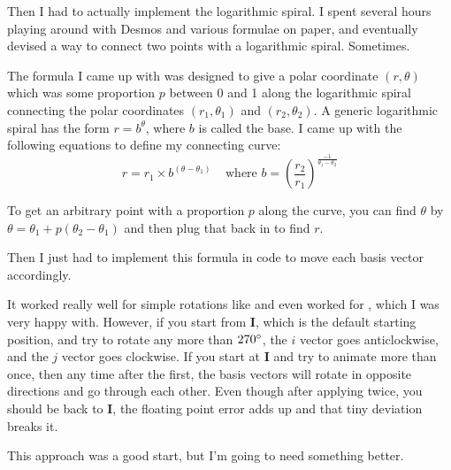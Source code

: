 \documentclass[../development.tex]{subfiles}
\begin{document}
Then I had to actually implement the logarithmic spiral. I spent several hours playing around with Desmos and various formulae on paper, and eventually devised a way to connect two points with a logarithmic spiral. Sometimes.

The formula I came up with was designed to give a polar coordinate $(r, \theta)$ which was some proportion $p$ between 0 and 1 along the logarithmic spiral connecting the polar coordinates $(r_1, \theta_1)$ and $(r_2, \theta_2)$. A generic logarithmic spiral has the form $r = b^\theta$, where $b$ is called the base. I came up with the following equations to define my connecting curve:
$$r = r_1 \times b^{(\theta - \theta_1)}\ \ \ \ \ \text{where } b = \left(\frac{r_2}{r_1}\right)^{\frac{-1}{\theta_1 - \theta_2}}$$

To get an arbitrary point with a proportion $p$ along the curve, you can find $\theta$ by $\theta = \theta_1 + p(\theta_2 - \theta_1)$ and then plug that back in to find $r$.

Then I just had to implement this formula in code to move each basis vector accordingly.


It worked really well for simple rotations like  and even worked for , which I was very happy with. However, if you start from $\mathbf{I}$, which is the default starting position, and try to rotate any more than $270\degree$, the $i$ vector goes anticlockwise, and the $j$ vector goes clockwise. If you start at $\mathbf{I}$ and try to animate  more than once, then any time after the first, the basis vectors will rotate in opposite directions and go through each other. Even though after applying  twice, you should be back to $\mathbf{I}$, the floating point error adds up and that tiny deviation breaks it.

This approach was a good start, but I'm going to need something better.
\end{document}
